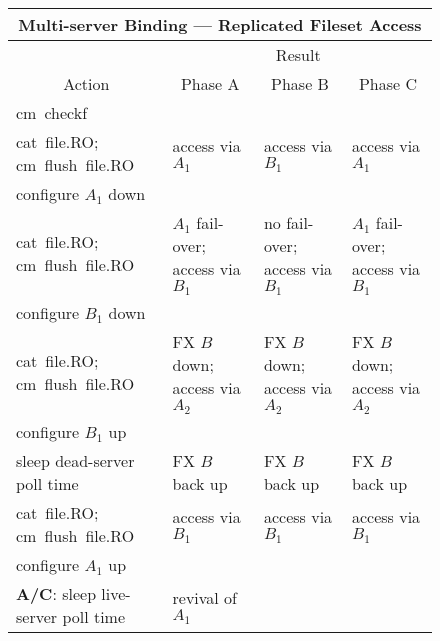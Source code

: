 \begin{figure}
\begin{tabular}{|p{1.4in}|p{0.9in}|p{0.9in}|p{0.9in}|}
\hline
\multicolumn{4}{|c|}{Multi-server Binding --- Replicated Fileset Access} \\
\hline
\hline
 & \multicolumn{3}{c|}{Result} \\ \cline{2-4}
\multicolumn{1}{|c|}{Action} & \multicolumn{1}{c|}{Phase A} &
    \multicolumn{1}{c|}{Phase B} & \multicolumn{1}{c|}{Phase C} \\
%
\hline
{\raggedright cm~checkf} & & & \\
%
\hline
{\raggedright cat~file.RO;\\cm~flush~file.RO} &
{\raggedright access via $A_{1}$} &
{\raggedright access via $B_{1}$} &
{\raggedright access via $A_{1}$} \\
%
\hline
{\raggedright configure $A_{1}$ down} & & & \\
%
\hline
{\raggedright cat~file.RO;\\cm~flush~file.RO} &
{\raggedright $A_{1}$ fail-over;\\access via $B_{1}$} &
{\raggedright no fail-over;\\access via $B_{1}$} &
{\raggedright $A_{1}$ fail-over;\\access via $B_{1}$} \\
%
\hline
{\raggedright configure $B_{1}$ down} & & & \\
%
\hline
{\raggedright cat~file.RO;\\cm~flush~file.RO} &
{\raggedright FX $B$ down;\\access via $A_{2}$} &
{\raggedright FX $B$ down;\\access via $A_{2}$} &
{\raggedright FX $B$ down;\\access via $A_{2}$} \\
%
\hline
{\raggedright configure $B_{1}$ up} & & & \\
%
\hline
{\raggedright sleep dead-server poll time} &
{\raggedright FX $B$ back up} &
{\raggedright FX $B$ back up} &
{\raggedright FX $B$ back up} \\
%
\hline
{\raggedright cat~file.RO;\\cm~flush~file.RO} &
{\raggedright access via $B_{1}$} &
{\raggedright access via $B_{1}$} &
{\raggedright access via $B_{1}$} \\
%
\hline
{\raggedright configure $A_{1}$ up} & & & \\
%
\hline
{\raggedright {\bf A/C}: sleep live-server poll time} &
{\raggedright revival of $A_{1}$} &

\end{tabular}
\end{figure}
